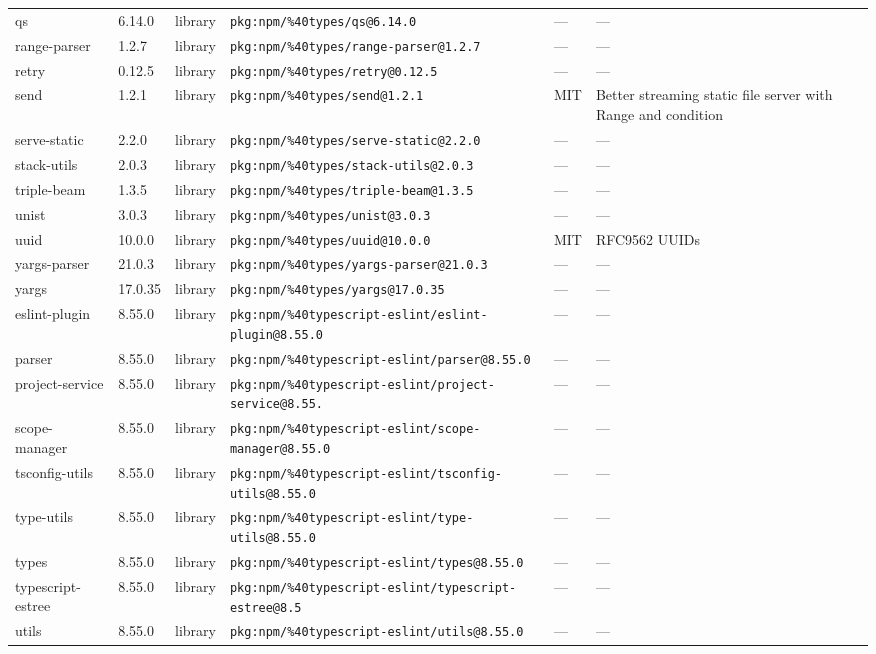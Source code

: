 \documentclass[11pt]{article}
\begin{document}
\begin{longtable}{|l|l|l|p{2.2cm}|l|p{4cm}|}
qs & 6.14.0 & library & \texttt{pkg:npm/\%40types/qs@6.14.0} & — & — \\
range-parser & 1.2.7 & library & \texttt{pkg:npm/\%40types/range-parser@1.2.7} & — & — \\
retry & 0.12.5 & library & \texttt{pkg:npm/\%40types/retry@0.12.5} & — & — \\
send & 1.2.1 & library & \texttt{pkg:npm/\%40types/send@1.2.1} & MIT & Better streaming static file server with Range and condition \\
serve-static & 2.2.0 & library & \texttt{pkg:npm/\%40types/serve-static@2.2.0} & — & — \\
stack-utils & 2.0.3 & library & \texttt{pkg:npm/\%40types/stack-utils@2.0.3} & — & — \\
triple-beam & 1.3.5 & library & \texttt{pkg:npm/\%40types/triple-beam@1.3.5} & — & — \\
unist & 3.0.3 & library & \texttt{pkg:npm/\%40types/unist@3.0.3} & — & — \\
uuid & 10.0.0 & library & \texttt{pkg:npm/\%40types/uuid@10.0.0} & MIT & RFC9562 UUIDs \\
yargs-parser & 21.0.3 & library & \texttt{pkg:npm/\%40types/yargs-parser@21.0.3} & — & — \\
yargs & 17.0.35 & library & \texttt{pkg:npm/\%40types/yargs@17.0.35} & — & — \\
eslint-plugin & 8.55.0 & library & \texttt{pkg:npm/\%40typescript-eslint/eslint-plugin@8.55.0} & — & — \\
parser & 8.55.0 & library & \texttt{pkg:npm/\%40typescript-eslint/parser@8.55.0} & — & — \\
project-service & 8.55.0 & library & \texttt{pkg:npm/\%40typescript-eslint/project-service@8.55.} & — & — \\
scope-manager & 8.55.0 & library & \texttt{pkg:npm/\%40typescript-eslint/scope-manager@8.55.0} & — & — \\
tsconfig-utils & 8.55.0 & library & \texttt{pkg:npm/\%40typescript-eslint/tsconfig-utils@8.55.0} & — & — \\
type-utils & 8.55.0 & library & \texttt{pkg:npm/\%40typescript-eslint/type-utils@8.55.0} & — & — \\
types & 8.55.0 & library & \texttt{pkg:npm/\%40typescript-eslint/types@8.55.0} & — & — \\
typescript-estree & 8.55.0 & library & \texttt{pkg:npm/\%40typescript-eslint/typescript-estree@8.5} & — & — \\
utils & 8.55.0 & library & \texttt{pkg:npm/\%40typescript-eslint/utils@8.55.0} & — & — \\

\end{longtable}
\end{document}
